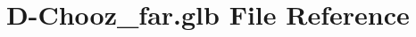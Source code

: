 \hypertarget{D-Chooz__far_8glb}{}\section{D-\/\+Chooz\+\_\+far.glb File Reference}
\label{D-Chooz__far_8glb}
